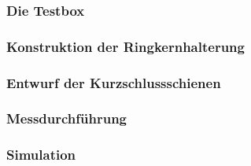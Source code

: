 \documentclass[accentcolor=tud9b, colorbacktitle, inverttitle]{tudbeamer}
\begin{document}
\begin{frame}\frametitle{Die Testbox}
\end{frame}


\begin{frame}\frametitle{Konstruktion der Ringkernhalterung}
 
\end{frame}


\begin{frame}\frametitle{Entwurf der Kurzschlussschienen}
 
\end{frame}




\begin{frame}\frametitle{Messdurchf\"uhrung}
\end{frame}






\begin{frame}\frametitle{Simulation}
\end{frame}
\end{document}
